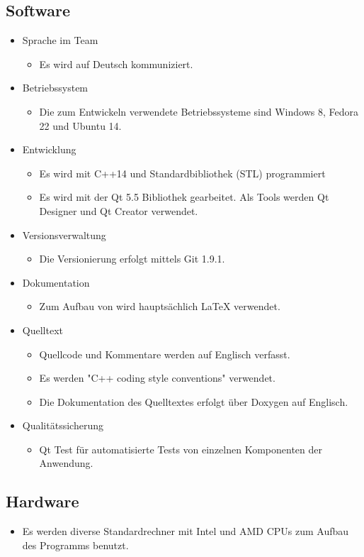 \subsection{Software}
\begin{itemize}
\item Sprache im Team
	\begin{itemize}[label={--}]
		\item Es wird auf Deutsch kommuniziert.
	\end{itemize}
\item Betriebssystem
	\begin{itemize}[label={--}]
		\item Die zum Entwickeln verwendete Betriebssysteme sind Windows 8, Fedora 22 und Ubuntu 14.
	\end{itemize}
\item Entwicklung
	\begin{itemize}[label={--}]
		\item Es wird mit C++14 und Standardbibliothek (STL) programmiert
		\item Es wird mit der \gls{Qt} 5.5 Bibliothek gearbeitet. Als Tools werden \gls{Qt Designer} und \gls{Qt Creator} verwendet.
	\end{itemize}
\item \gls{Versionsverwaltung}
	\begin{itemize}[label={--}]
		\item Die Versionierung erfolgt mittels Git 1.9.1.
	\end{itemize}
\item Dokumentation
	\begin{itemize}[label={--}]
		\item Zum Aufbau von  wird hauptsächlich LaTeX verwendet.
	\end{itemize}
\item Quelltext
	\begin{itemize}[label={--}]
		\item Quellcode und Kommentare werden auf Englisch verfasst.
		\item Es werden "C++ coding style conventions" verwendet.
		\item Die Dokumentation des Quelltextes erfolgt über Doxygen auf Englisch.
	\end{itemize}
\item Qualitätssicherung
	\begin{itemize}[label={--}]
		\item \gls{Qt Test} für automatisierte Tests von einzelnen Komponenten der Anwendung.
	\end{itemize}

\end{itemize}

\subsection{Hardware}
\begin{itemize}
	\item Es werden diverse Standardrechner mit Intel und AMD CPUs zum Aufbau des Programms benutzt.
\end{itemize}
\pagebreak
